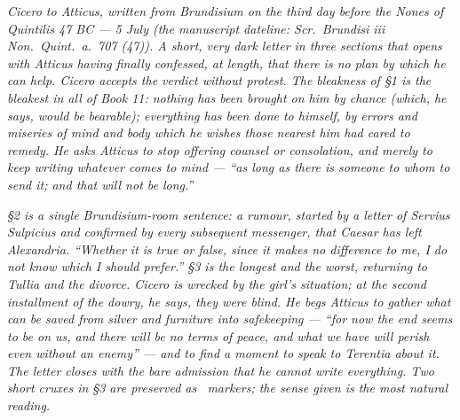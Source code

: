 
\textit{Cicero to Atticus, written from Brundisium on
the third day before the Nones of Quintilis 47 BC ---
5 July (the manuscript dateline: \textit{Scr.\ Brundisi
iii Non.\ Quint.\ a.\ 707 (47)}). A short, very dark
letter in three sections that opens with Atticus
having finally confessed, at length, that there is no
plan by which he can help. Cicero accepts the verdict
without protest. The bleakness of \S1 is the bleakest
in all of Book 11: nothing has been brought on him by
chance (which, he says, would be bearable); everything
has been done to himself, by errors and miseries of
mind and body which he wishes those nearest him had
cared to remedy. He asks Atticus to stop offering
counsel or consolation, and merely to keep writing
whatever comes to mind --- ``as long as there is
someone to whom to send it; and that will not be
long.''}

\textit{\S2 is a single Brundisium-room sentence: a
rumour, started by a letter of Servius Sulpicius and
confirmed by every subsequent messenger, that Caesar
has left Alexandria. ``Whether it is true or false,
since it makes no difference to me, I do not know
which I should prefer.'' \S3 is the longest and the
worst, returning to Tullia and the divorce. Cicero
is wrecked by the girl's situation; at the second
installment of the dowry, he says, they were blind.
He begs Atticus to gather what can be saved from
silver and furniture into safekeeping --- ``for now
the end seems to be on us, and there will be no
terms of peace, and what we have will perish even
without an enemy'' --- and to find a moment to speak
to Terentia about it. The letter closes with the
bare admission that he cannot write everything.
Two short cruxes in \S3 are preserved as \dag\
markers; the sense given is the most natural reading.}
